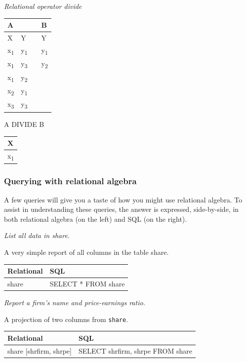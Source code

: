 \documentclass[
]{article}
\begin{document}
\emph{Relational operator divide}

\begin{longtable}[]{@{}llll@{}}
\toprule
A & & & B \\
\midrule
\endhead
X & Y & & Y \\
x\textsubscript{1} & y\textsubscript{1} & & y\textsubscript{1} \\
x\textsubscript{1} & y\textsubscript{3} & & y\textsubscript{2} \\
x\textsubscript{1} & y\textsubscript{2} & & \\
x\textsubscript{2} & y\textsubscript{1} & & \\
x\textsubscript{3} & y\textsubscript{3} & & \\
\bottomrule
\end{longtable}

A DIVIDE B

\begin{longtable}[]{@{}l@{}}
\toprule
X \\
\midrule
\endhead
x\textsubscript{1} \\
\bottomrule
\end{longtable}

\hypertarget{querying-with-relational-algebra}{%
\subsubsection*{Querying with relational algebra}\label{querying-with-relational-algebra}}

A few queries will give you a taste of how you might use relational
algebra. To assist in understanding these queries, the answer is
expressed, side-by-side, in both relational algebra (on the left) and
SQL (on the right).

\emph{List all data in share.}

A very simple report of all columns in the table share.

\begin{longtable}[]{@{}ll@{}}
\toprule
Relational & SQL \\
\midrule
\endhead
share & SELECT * FROM share \\
\bottomrule
\end{longtable}

\emph{Report a firm's name and price-earnings ratio.}

A projection of two columns from \texttt{share}.

\begin{longtable}[]{@{}ll@{}}
\toprule
Relational & SQL \\
\midrule
\endhead
share {[}shrfirm, shrpe{]} & SELECT shrfirm, shrpe FROM share \\
\bottomrule
\end{longtable}
\end{document}
